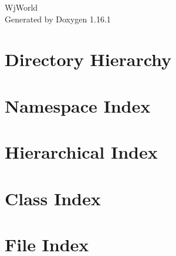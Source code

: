 \documentclass[twoside]{book}
\newcommand{\+}{\discretionary{\mbox{\scriptsize$\hookleftarrow$}}{}{}}
\newcommand{\clearemptydoublepage}{%
    \newpage{\pagestyle{empty}\cleardoublepage}%
  }
\begin{document}
  \raggedbottom
    \hypersetup{pageanchor=false,
                bookmarksnumbered=true,
                pdfencoding=unicode
               }
  \begin{titlepage}
  \vspace*{7cm}
  \begin{center}%
  {\Large Wj\+World}\\
  \vspace*{1cm}
  {\large Generated by Doxygen 1.16.1}\\
  \end{center}
  \end{titlepage}
  \clearemptydoublepage
  \tableofcontents
  \clearemptydoublepage
  \hypersetup{pageanchor=true}
\chapter{Directory Hierarchy}

\chapter{Namespace Index}

\chapter{Hierarchical Index}

\chapter{Class Index}

\chapter{File Index}

\end{document}
